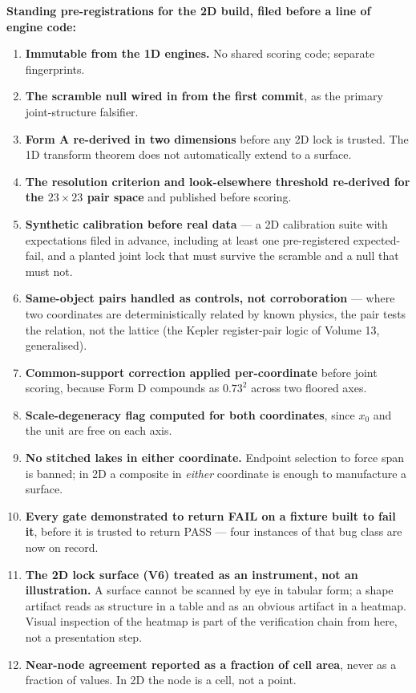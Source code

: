 \documentclass[11pt, letterpaper, openany]{book}
\begin{document}
\begin{predictionbox}
\textbf{Standing pre-registrations for the 2D build, filed before a line of engine code:}
\begin{enumerate}
    \item \textbf{Immutable from the 1D engines.} No shared scoring code; separate fingerprints.
    \item \textbf{The scramble null wired in from the first commit}, as the primary joint-structure
          falsifier.
    \item \textbf{Form A re-derived in two dimensions} before any 2D lock is trusted. The 1D
          transform theorem does not automatically extend to a surface.
    \item \textbf{The resolution criterion and look-elsewhere threshold re-derived for the
          $23\times23$ pair space} and published before scoring.
    \item \textbf{Synthetic calibration before real data} --- a 2D calibration suite with
          expectations filed in advance, including at least one pre-registered expected-fail, and
          a planted joint lock that must survive the scramble and a null that must not.
    \item \textbf{Same-object pairs handled as controls, not corroboration} --- where two
          coordinates are deterministically related by known physics, the pair tests the relation,
          not the lattice (the Kepler register-pair logic of Volume 13, generalised).
    \item \textbf{Common-support correction applied per-coordinate} before joint scoring, because
          Form D compounds as $0.73^2$ across two floored axes.
    \item \textbf{Scale-degeneracy flag computed for both coordinates}, since $x_0$ and the unit
          are free on each axis.
    \item \textbf{No stitched lakes in either coordinate.} Endpoint selection to force span is
          banned; in 2D a composite in \emph{either} coordinate is enough to manufacture a surface.
    \item \textbf{Every gate demonstrated to return FAIL on a fixture built to fail it}, before it
          is trusted to return PASS --- four instances of that bug class are now on record.
    \item \textbf{The 2D lock surface (V6) treated as an instrument, not an illustration.} A
          surface cannot be scanned by eye in tabular form; a shape artifact reads as structure in a
          table and as an obvious artifact in a heatmap. Visual inspection of the heatmap is part of
          the verification chain from here, not a presentation step.
    \item \textbf{Near-node agreement reported as a fraction of cell area}, never as a fraction of
          values. In 2D the node is a cell, not a point.
\end{enumerate}
\end{predictionbox}
\end{document}
